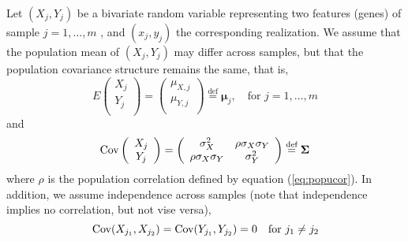 Let $(X_j, Y_j)$ be a bivariate random variable representing two features (genes) of sample $j 
= 1, \ldots, m$ , and $(x_j, y_j)$ the corresponding realization.
We assume that the population mean of $(X_j, Y_j)$ may differ across samples, but that the 
population covariance structure remains the 
same, that is,  
\begin{equation}\label{eq:meanstruct}
E  \left(\begin{array}{c}
X_j\\
Y_j\\	
\end{array} \right) 
= 	\left(\begin{array}{c}
\mu_{X,j}\\
\mu_{Y,j}\\
\end{array} \right)\stackrel{\text{def}}{=} \bm \mu_j,  \text{~~ for $j = 1, \ldots, m$}
\end{equation}
and 
\begin{equation}\label{eq:covstruct}
\text{Cov}\left(\begin{array}{c}
X_j\\
Y_j\\	
\end{array} \right)	
= \left(
\begin{array}{cc}
\sigma_X^2 &\rho \sigma_X\sigma_Y \\
\rho \sigma_X \sigma_Y & 	\sigma_Y^2 \\
\end{array} 
\right)
\stackrel{\text{def}}{=} \bm \Sigma 
\end{equation}
where $\rho$ is the population correlation defined by equation (\ref{eq:popucor}). In addition, 
we assume independence across samples (note that independence implies no correlation, but not 
vise versa), 
\begin{equation}\label{eq:indepsamples}
\text{Cov}(X_{j_1}, X_{j_2}) = \text{Cov}(Y_{j_1}, Y_{j_2}) = 0 \text{~~~for $j_1\neq j_2$}
\end{equation}





